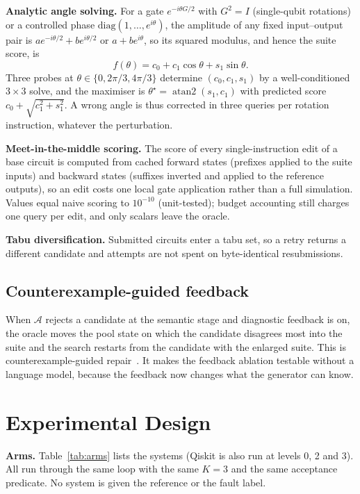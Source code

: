\documentclass[journal]{IEEEtran}
\begin{document}
\textbf{Analytic angle solving.} For a gate $e^{-i\theta G/2}$ with $G^2=I$
(single-qubit rotations) or a controlled phase $\mathrm{diag}(1,\dots,e^{i\theta})$,
the amplitude of any fixed input--output pair is $a e^{-i\theta/2}+be^{i\theta/2}$
or $a+be^{i\theta}$, so its squared modulus, and hence the suite score, is
\begin{equation}
f(\theta)=c_0+c_1\cos\theta+s_1\sin\theta .
\end{equation}
Three probes at $\theta\in\{0,2\pi/3,4\pi/3\}$ determine $(c_0,c_1,s_1)$ by a
well-conditioned $3\times3$ solve, and the maximiser is
$\theta^\star=\operatorname{atan2}(s_1,c_1)$ with predicted score
$c_0+\sqrt{c_1^2+s_1^2}$. A wrong angle is thus corrected in three queries per
rotation instruction, whatever the perturbation.

\textbf{Meet-in-the-middle scoring.} The score of every single-instruction edit
of a base circuit is computed from cached forward states (prefixes applied to the
suite inputs) and backward states (suffixes inverted and applied to the
reference outputs), so an edit costs one local gate application rather than a
full simulation. Values equal naive scoring to $10^{-10}$ (unit-tested); budget
accounting still charges one query per edit, and only scalars leave the oracle.

\textbf{Tabu diversification.} Submitted circuits enter a tabu set, so a retry
returns a different candidate and attempts are not spent on byte-identical
resubmissions.

\subsection{Counterexample-guided feedback}

When $\mathcal{A}$ rejects a candidate at the semantic stage and diagnostic
feedback is on, the oracle moves the pool state on which the candidate disagrees
most into the suite and the search restarts from the candidate with the enlarged
suite. This is counterexample-guided repair~\cite{solarlezama2006sketching}. It
makes the feedback ablation testable without a language model, because the
feedback now changes what the generator can know.

\section{Experimental Design}
\label{sec:design}

\textbf{Arms.} Table~\ref{tab:arms} lists the systems (Qiskit is also run at levels 0, 2 and 3). All run through the
same loop with the same $K=3$ and the same acceptance predicate. No system is
given the reference or the fault label.
\end{document}
